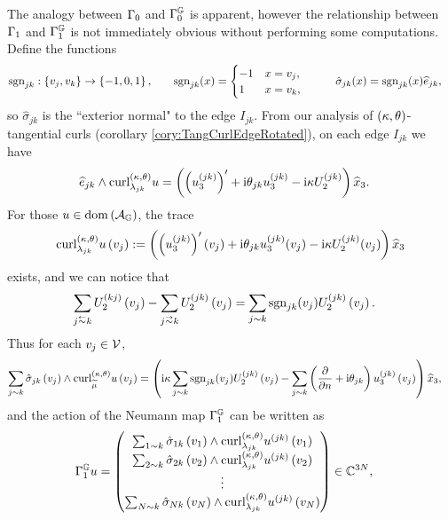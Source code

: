 The analogy between $\Gamma_0$ and $\Gamma_0^{\mathbb{G}}$ is apparent, however the relationship between $\Gamma_1$ and $\Gamma_1^{\mathbb{G}}$ is not immediately obvious without performing some computations.
Define the functions
\begin{align*}
	\mathrm{sgn}_{jk}: \left\{ v_j, v_k \right\} \rightarrow \left\{ -1,0,1 \right\}, 
	&\qquad
	\mathrm{sgn}_{jk}(x) = \begin{cases} -1 & x=v_j, \\ 1 & x=v_k, \end{cases}
	&\qquad
	\hat{\sigma}_{jk}(x) &= \mathrm{sgn}_{jk}(x)\widehat{e}_{jk},
\end{align*}
so $\hat{\sigma}_{jk}$ is the ``exterior normal" to the edge $I_{jk}$.
From our analysis of $\left( \kappa, \theta \right)$-tangential curls (corollary \ref{cory:TangCurlEdgeRotated}), on each edge $I_{jk}$ we have
\begin{align*}
	\widehat{e}_{jk}\wedge\mathrm{curl}_{\lambda_{jk}}^{\left( \kappa, \theta \right)}u &= \left(  \left(  u_3^{(jk)}  \right)' + \mathrm{i}\theta_{jk}u_3^{(jk)} - \mathrm{i}\kappa U_2^{(jk)}  \right)\widehat{x}_3.
\end{align*}
For those $u\in\mathrm{dom}\left( \mathcal{A}_{\mathbb{G}} \right)$, the trace
\begin{align*}
	\mathrm{curl}_{\lambda_{jk}}^{\left( \kappa, \theta \right)}u\left( v_j \right):= \left(  \left(  u_3^{(jk)}  \right)'(v_j) + \mathrm{i}\theta_{jk}u_3^{(jk)}(v_j) - \mathrm{i}\kappa U_2^{(jk)}(v_j)  \right)\widehat{x}_3
\end{align*}
exists, and we can notice that 
\begin{align*}
	\sum_{j\conRight k} U_2^{(kj)}\bracs{v_j} - \sum_{j\conLeft k} U_2^{(jk)}\bracs{v_j} &=
	\sum_{j\con k} \sgn_{jk}(v_j) U_2^{(jk)}\bracs{v_j}.
\end{align*} 
Thus for each $v_j\in\mathcal{V}$,
\begin{align*}
	\sum_{j\sim k} \hat{\sigma}_{jk}\left( v_j \right) \wedge \mathrm{curl}_{\widetilde{\mu}}^{\left( \kappa, \theta \right)}u\left( v_j \right)
	&= \left(  
	\mathrm{i}\kappa\sum_{j\sim k} \mathrm{sgn}_{jk}(v_j) U_2^{(jk)}\left( v_j \right)
	- \sum_{j\sim k}\left( \dfrac{\partial }{\partial n} + \mathrm{i}\theta_{jk} \right)u_3^{(jk)}\left( v_j \right)
	 \right) \widehat{x}_3,
\end{align*}
and the action of the Neumann map $\Gamma_1^{\mathbb{G}}$ can be written as
\begin{align} \label{eq:NGMap-CurlTraceForm}
	\Gamma_1^{\mathbb{G}} u &= 
	\begin{pmatrix}
		\sum_{1\sim k} \hat{\sigma}_{1k}\left( v_1 \right)\wedge\mathrm{curl}_{\lambda_{jk}}^{\left( \kappa, \theta \right)}u^{(jk)}\left( v_1 \right) \\
		\sum_{2\sim k} \hat{\sigma}_{2k}\left( v_2 \right)\wedge\mathrm{curl}_{\lambda_{jk}}^{\left( \kappa, \theta \right)}u^{(jk)}\left( v_2 \right) \\
		\vdots \\
		\sum_{N\sim k} \hat{\sigma}_{Nk}\left( v_N \right)\wedge\mathrm{curl}_{\lambda_{jk}}^{\left( \kappa, \theta \right)}u^{(jk)}\left( v_N \right)
	\end{pmatrix}
	\in\mathbb{C}^{3N},
\end{align}
